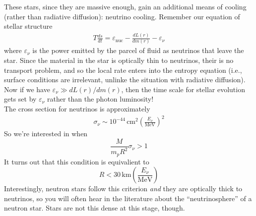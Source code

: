 \documentclass[10pt]{article}
\numberwithin{equation}{section}
\newcommand{\n}{\noindent}
\begin{document}
    These stars, since they are massive enough, gain an additional
    means of cooling (rather than radiative diffusion): neutrino
    cooling. Remember our equation of stellar structure
    \begin{align}
      \label{eq:337}
      T\frac{ds}{dt}=\varepsilon_{\mathrm{nuc}}-\frac{dL(r)}{dm(r)}-
\varepsilon_\nu
    \end{align}
    where $\varepsilon_\nu$ is the power emitted by the parcel of
    fluid as neutrinos that leave the star. Since the material in the
    star is optically thin to neutrinos, their is no transport
    problem, and so the local rate enters into the entropy equation
    (i.e., surface conditions are irrelevant, unlinke the situation
    with radiative diffusion).\\

    \n Now if we have $\varepsilon_\nu\gg dL(r)/dm(r)$, then the time
    scale for stellar evolution gets set by $\varepsilon_\nu$ rather
    than the photon luminosity!\\

    \n The cross section for neutrinos is approximately
    \begin{align}
      \label{eq:338}
      \sigma_\nu\sim 10^{-44}\,\mathrm{cm^2}\left(\frac{E_\nu}{\mathrm
{MeV}}\right)^2
    \end{align}
    So we're interested in when
    \begin{equation}
      \label{eq:339}
      \frac{M}{m_pR^2}\sigma_\nu>1
    \end{equation}
    It turns out that this condition is equivalient to
    \begin{equation}
      \label{eq:341}
      R<30\,\mathrm{km}\left(\frac{E_\nu}{\mathrm{MeV}}\right)
    \end{equation}
    Interestingly, neutron stars follow this criterion \emph{and} they
    are optically thick to neutrinos, so you will often hear in the
    literature about the ``neutrinosphere'' of a neutron star. Stars are
    not this dense at this stage, though.\\
\end{document}

